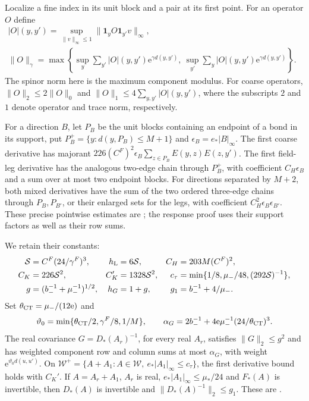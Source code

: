 Localize a fine index in its unit block and a pair at its first
point. For an operator $O$ define
\begin{align*}
 |O|(y,y')=\sup_{\|v\|_\infty\le1}
                       \|\mathbf1_yO\mathbf1_{y'}v\|_\infty,\qquad&\\
 \|O\|_\gamma=\max\left\{
 \sup_y\sum_{y'}|O|(y,y')\mathrm e^{\gamma d(y,y')},\
 \sup_{y'}\sum_y|O|(y,y')\mathrm e^{\gamma d(y,y')}\right\}.&
\end{align*}
The spinor norm here is the maximum component modulus.
For coarse operators, $\|O\|_2\le2\|O\|_0$ and
$\|O\|_1\le4\sum_{y,y'}|O|(y,y')$, where the subscripts
$2$ and $1$ denote operator and trace norm, respectively.

For a direction $B$, let $P_B$ be the unit blocks containing
an endpoint of a bond in its support, put
$P_B^+=\{y:d(y,P_B)\le M+1\}$ and
$\epsilon_B=e_*|B|_\infty$.
The first coarse derivative has majorant
$226(C^F)^2\epsilon_B\sum_{z\in P_B}E(y,z)E(z,y')$.
The first field-leg derivative has the analogous two-edge chain
through $P_B^+$, with coefficient $C_H\epsilon_B$ and a sum
over at most two endpoint blocks. For directions separated by
$M+2$, both mixed derivatives have the sum of the two ordered
three-edge chains through $P_B,P_{B'}$, or their enlarged sets
for the legs, with coefficient $C_H^2\epsilon_B\epsilon_{B'}$.
These precise pointwise estimates are
\cite[Proposition~A.1]{TerminalPressure}; the response proof uses
their support factors as well as their row sums.

We retain their constants:
\begin{align*}
 \mathcal S&=C^F(24/\gamma^F)^3,&
 h_{\rm L}&=6\mathcal S,& C_H&=203M(C^F)^2,\\
 C_K&=226\mathcal S^2,& C_K'&=1328\mathcal S^2,&
 c_\tau&=\min\{1/8,\mu_-/48,(292\mathcal S)^{-1}\},\\
 g&=(b_-^{-1}+\mu_-^{-1})^{1/2},&h_G&=1+g,&g_1&=b_-^{-1}+4/\mu_-.
\end{align*}
Set $\theta_{\rm CT}=\mu_-/(12\mathrm e)$ and
\[
 \vartheta_0=\min\{\theta_{\rm CT}/2,\gamma^F/8,1/M\},\qquad
 \alpha_G=2b_-^{-1}
           +4\mathrm e\mu_-^{-1}(24/\theta_{\rm CT})^3.
\]
The real covariance $G=D_*(A_r)^{-1}$, for every real $A_r$,
satisfies $\|G\|_2\le g^2$ and has weighted component row and
column sums at most $\alpha_G$, with weight
$\mathrm e^{\vartheta_0d(u,u')}$.
On $\mathcal W^+=\{A+A_1:A\in\mathcal W,\ e_*|A_1|_\infty\le c_\tau\}$,
the first derivative bound holds with $C_K'$.
If $A=A_r+A_1$, $A_r$ is real, $e_*|A_1|_\infty\le\mu_*/24$
and $F_*(A)$ is invertible, then $D_*(A)$ is invertible and
$\|D_*(A)^{-1}\|_2\le g_1$.
These are \cite[(72)--(75)]{TerminalPressure}.

